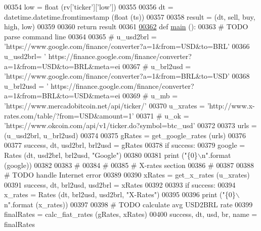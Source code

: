 \begin{DoxyCode}
{{{00354     low  = float (rv[\textcolor{stringliteral}{'ticker'}][\textcolor{stringliteral}{'low'}])
00355     
00356     dt = datetime.datetime.fromtimestamp (float (ts))
00357     
00358     result = (dt, sell, buy, high, low)
00359     
00360     \textcolor{keywordflow}{return} result
00361 
\hypertarget{exch2exch_8py_source.tex_l00362}{}\hyperlink{namespaceexch2exch_a4a7d6bc2c47add0970ca3e0c28a5cb63}{00362} \textcolor{keyword}{def }\hyperlink{namespaceexch2exch_a4a7d6bc2c47add0970ca3e0c28a5cb63}{main} ():
00363     \textcolor{comment}{# TODO parse command line }
00364 
00365     \textcolor{comment}{# u\_usd2brl = 'https://www.google.com/finance/converter?a=1&from=USD&to=BRL'}
00366     u\_usd2brl= \textcolor{stringliteral}{'
      https://finance.google.com/finance/converter?a=1&from=USD&to=BRL&meta=ei%
00367 \textcolor{comment}{#    u\_brl2usd = 'https://www.google.com/finance/converter?a=1&from=BRL&to=USD'}
00368     u\_brl2usd = \textcolor{stringliteral}{'
      https://finance.google.com/finance/converter?a=1&from=BRL&to=USD&meta=ei%
00369 \textcolor{comment}{#    u\_mb      = 'https://www.mercadobitcoin.net/api/ticker/'}
00370     u\_xrates  = \textcolor{stringliteral}{'http://www.x-rates.com/table/?from=USD&amount=1'}
00371 \textcolor{comment}{#    u\_ok      = 'https://www.okcoin.com/api/v1/ticker.do?symbol=btc\_usd'}
00372     
00373     urls = (u\_usd2brl, u\_brl2usd)
00374     
00375     gRates = get\_google\_rates (urls)
00376     
00377     success, dt, usd2brl, brl2usd = gRates
00378     \textcolor{keywordflow}{if} success:   
00379         google = Rates (dt, usd2brl, brl2usd, \textcolor{stringliteral}{"Google"})
00380     
00381         \textcolor{keywordflow}{print} (\textcolor{stringliteral}{"\{0\}\(\backslash\)n"}.format (google))
00382     
00383     \textcolor{comment}{#}
00384     \textcolor{comment}{#}
00385     \textcolor{comment}{# X-rates section }
00386     \textcolor{comment}{# }
00387     
00388     \textcolor{comment}{# TODO handle Internet error }
00389 
00390     xRates = get\_x\_rates (u\_xrates)
00391     success, dt, brl2usd, usd2brl = xRates
00392     
00393     \textcolor{keywordflow}{if} success:
00394         x\_rates = Rates (dt, brl2usd, usd2brl, \textcolor{stringliteral}{"X-Rates"})
00395     
00396         \textcolor{keywordflow}{print} (\textcolor{stringliteral}{"\{0\}\(\backslash\)n"}.format (x\_rates))
00397     
00398     \textcolor{comment}{# TODO calculate avg USD2BRL rate}
00399     finalRates = calc\_fiat\_rates (gRates, xRates)
00400     success, dt, usd, br, name = finalRates
}}}}}
\end{DoxyCode}
